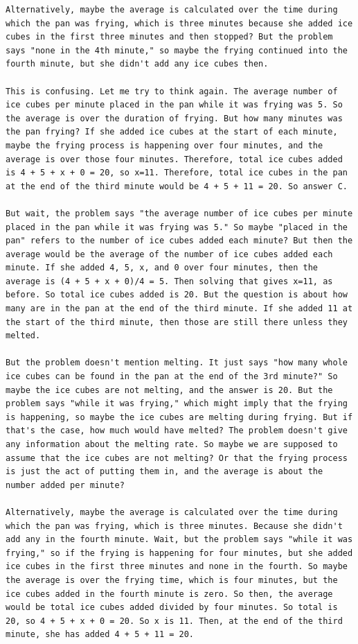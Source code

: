 \documentclass{article}
\theoremstyle{plain}
\theoremstyle{definition}
\theoremstyle{remark}
\begin{document}
\begin{lstlisting}
Alternatively, maybe the average is calculated over the time during which the pan was frying, which is three minutes because she added ice cubes in the first three minutes and then stopped? But the problem says "none in the 4th minute," so maybe the frying continued into the fourth minute, but she didn't add any ice cubes then.

This is confusing. Let me try to think again. The average number of ice cubes per minute placed in the pan while it was frying was 5. So the average is over the duration of frying. But how many minutes was the pan frying? If she added ice cubes at the start of each minute, maybe the frying process is happening over four minutes, and the average is over those four minutes. Therefore, total ice cubes added is 4 + 5 + x + 0 = 20, so x=11. Therefore, total ice cubes in the pan at the end of the third minute would be 4 + 5 + 11 = 20. So answer C.

But wait, the problem says "the average number of ice cubes per minute placed in the pan while it was frying was 5." So maybe "placed in the pan" refers to the number of ice cubes added each minute? But then the average would be the average of the number of ice cubes added each minute. If she added 4, 5, x, and 0 over four minutes, then the average is (4 + 5 + x + 0)/4 = 5. Then solving that gives x=11, as before. So total ice cubes added is 20. But the question is about how many are in the pan at the end of the third minute. If she added 11 at the start of the third minute, then those are still there unless they melted.

But the problem doesn't mention melting. It just says "how many whole ice cubes can be found in the pan at the end of the 3rd minute?" So maybe the ice cubes are not melting, and the answer is 20. But the problem says "while it was frying," which might imply that the frying is happening, so maybe the ice cubes are melting during frying. But if that's the case, how much would have melted? The problem doesn't give any information about the melting rate. So maybe we are supposed to assume that the ice cubes are not melting? Or that the frying process is just the act of putting them in, and the average is about the number added per minute?

Alternatively, maybe the average is calculated over the time during which the pan was frying, which is three minutes. Because she didn't add any in the fourth minute. Wait, but the problem says "while it was frying," so if the frying is happening for four minutes, but she added ice cubes in the first three minutes and none in the fourth. So maybe the average is over the frying time, which is four minutes, but the ice cubes added in the fourth minute is zero. So then, the average would be total ice cubes added divided by four minutes. So total is 20, so 4 + 5 + x + 0 = 20. So x is 11. Then, at the end of the third minute, she has added 4 + 5 + 11 = 20.


\end{lstlisting}
\end{document}
